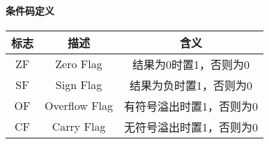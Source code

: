\paragraph{条件码定义}
\begin{table}[H]
    \centering
    \begin{tabular}{|c|c|c|}
        \hline
        \textbf{标志} & \textbf{描述}   & \textbf{含义}   \\
        \hline
        ZF          & Zero Flag     & 结果为0时置1，否则为0  \\
        \hline
        SF          & Sign Flag     & 结果为负时置1，否则为0  \\
        \hline
        OF          & Overflow Flag & 有符号溢出时置1，否则为0 \\
        \hline
        CF          & Carry Flag    & 无符号溢出时置1，否则为0 \\
        \hline
    \end{tabular}
\end{table}
